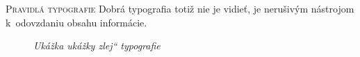 \documentclass[xcolor=dvipsnames]{beamer}
\newcommand{\myuv}[1]{\quotedblbase #1\textquotedblleft}
\begin{document}
\begin{frame}{\textsc{\large{Pravidlá typografie}}}
	Dobrá typografia totiž nie je vidieť, je nerušivým nástrojom k~odovzdaniu obsahu informácie.
	\bigskip
	\begin{figure}[ht]
		\begin{center}
    		\caption{\textit{Ukážka ukážky \myuv{zlej} typografie}}
		\end{center}
	\end{figure}
\end{frame}

\end{document}

